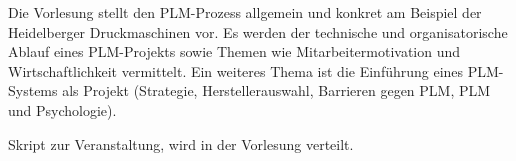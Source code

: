 \begin{course}
\begin{content}
Die Vorlesung stellt den PLM-Prozess allgemein und konkret am Beispiel der Heidelberger Druckmaschinen vor. Es werden der technische und organisatorische Ablauf eines PLM-Projekts sowie Themen wie Mitarbeitermotivation und Wirtschaftlichkeit vermittelt. Ein weiteres Thema ist die Einführung eines PLM-Systems als Projekt (Strategie, Herstellerauswahl, Barrieren gegen PLM, PLM und Psychologie).


\end{content}

\begin{media}Skript zur Veranstaltung, wird in der Vorlesung verteilt.

\end{media}





\end{course}